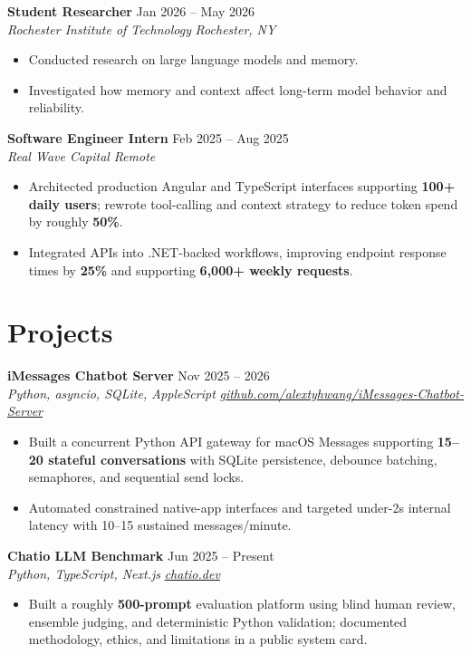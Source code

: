 \documentclass[10pt,letterpaper]{article}
\newif\ifresumeFirstRole
\newcommand{\resumeRole}[4]{%
  \ifresumeFirstRole
    \global\resumeFirstRolefalse
  \else
    \vspace{0pt plus 1fill}%
  \fi
  \textbf{#1} \hfill #2\\
  \textit{#3} \hfill \textit{#4}
}
\begin{document}
\resumeRole{Student Researcher}{Jan 2026 -- May 2026}{Rochester Institute of Technology}{Rochester, NY}
\begin{itemize}
  \item Conducted research on large language models and memory.
  \item Investigated how memory and context affect long-term model behavior and reliability.
\end{itemize}

\resumeRole{Software Engineer Intern}{Feb 2025 -- Aug 2025}{Real Wave Capital}{Remote}
\begin{itemize}
  \item Architected production Angular and TypeScript interfaces supporting \textbf{100+ daily users}; rewrote tool-calling and context strategy to reduce token spend by roughly \textbf{50\%}.
  \item Integrated APIs into .NET-backed workflows, improving endpoint response times by \textbf{25\%} and supporting \textbf{6,000+ weekly requests}.
\end{itemize}

\section*{Projects}
\resumeRole{iMessages Chatbot Server}{Nov 2025 -- 2026}{Python, asyncio, SQLite, AppleScript}{\href{https://github.com/alextyhwang/iMessages-Chatbot-Server}{github.com/alextyhwang/iMessages-Chatbot-Server}}
\begin{itemize}
  \item Built a concurrent Python API gateway for macOS Messages supporting \textbf{15--20 stateful conversations} with SQLite persistence, debounce batching, semaphores, and sequential send locks.
  \item Automated constrained native-app interfaces and targeted under-2s internal latency with 10--15 sustained messages/minute.
\end{itemize}

\resumeRole{Chatio LLM Benchmark}{Jun 2025 -- Present}{Python, TypeScript, Next.js}{\href{https://chatio.dev}{chatio.dev}}
\begin{itemize}
  \item Built a roughly \textbf{500-prompt} evaluation platform using blind human review, ensemble judging, and deterministic Python validation; documented methodology, ethics, and limitations in a public system card.
\end{itemize}
\end{document}
